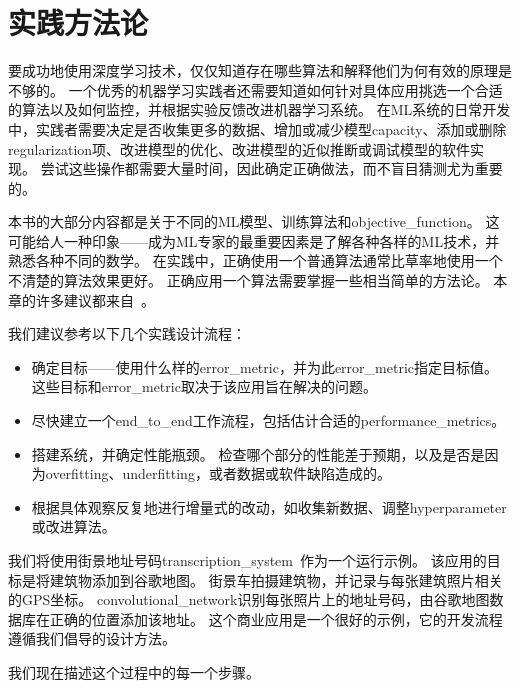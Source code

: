 \chapter{实践方法论}
\label{chap:practical_methodology}
要成功地使用深度学习技术，仅仅知道存在哪些算法和解释他们为何有效的原理是不够的。
一个优秀的机器学习实践者还需要知道如何针对具体应用挑选一个合适的算法以及如何监控，并根据实验反馈改进机器学习系统。
在\gls{ML}系统的日常开发中，实践者需要决定是否收集更多的数据、增加或减少模型\gls{capacity}、添加或删除\gls{regularization}项、改进模型的优化、改进模型的近似推断或调试模型的软件实现。
尝试这些操作都需要大量时间，因此确定正确做法，而不盲目猜测尤为重要的。


本书的大部分内容都是关于不同的\gls{ML}模型、训练算法和\gls{objective_function}。
这可能给人一种印象——成为\gls{ML}专家的最重要因素是了解各种各样的\gls{ML}技术，并熟悉各种不同的数学。
在实践中，正确使用一个普通算法通常比草率地使用一个不清楚的算法效果更好。
正确应用一个算法需要掌握一些相当简单的方法论。
本章的许多建议都来自~\cite{ng-lecture-advice}。


我们建议参考以下几个实践设计流程：
\begin{itemize}
\item 确定目标——使用什么样的\gls{error_metric}，并为此\gls{error_metric}指定目标值。
这些目标和\gls{error_metric}取决于该应用旨在解决的问题。


\item 尽快建立一个\gls{end_to_end}工作流程，包括估计合适的\gls{performance_metrics}。

\item 搭建系统，并确定性能瓶颈。
检查哪个部分的性能差于预期，以及是否是因为\gls{overfitting}、\gls{underfitting}，或者数据或软件缺陷造成的。

\item 根据具体观察反复地进行增量式的改动，如收集新数据、调整\gls{hyperparameter}或改进算法。
\end{itemize}


我们将使用街景地址号码\gls{transcription_system}~\citep{Goodfellow+et+al-ICLR2014a}作为一个运行示例。
该应用的目标是将建筑物添加到谷歌地图。
街景车拍摄建筑物，并记录与每张建筑照片相关的GPS坐标。
\gls{convolutional_network}识别每张照片上的地址号码，由谷歌地图数据库在正确的位置添加该地址。
这个商业应用是一个很好的示例，它的开发流程遵循我们倡导的设计方法。

我们现在描述这个过程中的每一个步骤。




